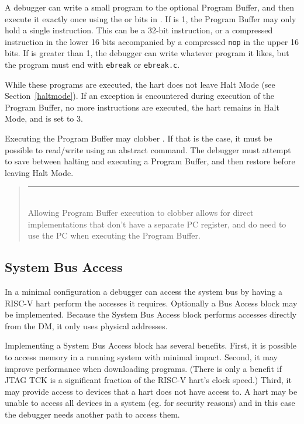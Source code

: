 \documentclass{article}
\newenvironment{commentary}
{
   \begin{quotation}
   \noindent
   \small \em
   \rule{\linewidth}{1pt}\\
}
{
   \end{quotation}
}
\begin{document}
A debugger can write a small program to the optional Program Buffer, and then
execute it exactly once using the \Fpreexec or \Fpostexec bits in \Rcommand.
If \Fprogsize is 1, the Program Buffer may only hold a single instruction.
This can be a 32-bit
instruction, or a compressed instruction in the lower 16 bits accompanied by a
compressed {\tt nop} in the upper 16 bits.  If \Fprogsize is greater than 1,
the debugger can write whatever program it likes, but the program must end with
{\tt ebreak} or {\tt ebreak.c}.

While these programs are executed, the hart does not leave Halt Mode (see
Section~\ref{haltmode}).  If an exception is encountered during execution of
the Program Buffer, no more instructions are executed, the hart remains in Halt
Mode, and \Fcmderr is set to 3.

Executing the Program Buffer may clobber \Rdpc. If that is the case, it must be
possible to read/write \Rdpc using an abstract command. The debugger must
attempt to save \Rdpc between halting and executing a Program Buffer, and then
restore \Rdpc before leaving Halt Mode.

\begin{commentary}
    Allowing Program Buffer execution to clobber \Rdpc allows for direct
    implementations that don't have a separate PC register, and do need to use
    the PC when executing the Program Buffer.
\end{commentary}

\subsection{System Bus Access} \label{systembusaccess}

In a minimal configuration a debugger can access the system bus by having a
RISC-V hart perform the accesses it requires. Optionally a Bus Access block may
be implemented. Because the System Bus Access block performs accesses directly
from the DM, it only uses physical addresses.

Implementing a System Bus Access block has several benefits.
First, it is possible to
access memory in a running system with minimal impact.  Second, it may improve
performance when downloading programs. (There is only a benefit if JTAG TCK is a
significant fraction of the RISC-V hart's clock speed.)  Third, it may provide
access to devices that a hart does not have access to. A hart may be unable to
access all devices in a system (eg. for security reasons) and in this case the
debugger needs another path to access them.
\end{document}
